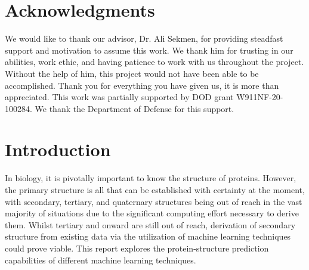 \documentclass[12pt,letterpaper,oneside,reqno]{book}
\theoremstyle{plain}
\theoremstyle{definition}
\theoremstyle{plain}
\theoremstyle{remark}
\theoremstyle{plain}
\theoremstyle{definition}
\theoremstyle{plain}
\begin{document}
\chapter{Acknowledgments}

We would like to thank our advisor, Dr. Ali Sekmen, for providing steadfast support and motivation to assume this work. We thank him for trusting in our abilities, work ethic, and having patience to work with us throughout the project. Without the help of him, this project would not have been able to be accomplished. Thank you for everything you have given us, it is more than appreciated. This work was partially supported by DOD grant W911NF-20-100284. We thank the Department of Defense for this support.


\singlespacing
\tableofcontents

\listoffigures
{}

\listoftables
{}


\lstlistoflistings
{}

\doublespacing


\mainmatter
{}

\chapter{Introduction}
In biology, it is pivotally important to know the structure of proteins. However, the primary structure is all that can be established with certainty at the moment, with secondary, tertiary, and quaternary structures being out of reach in the vast majority of situations due to the significant computing effort necessary to derive them. Whilst tertiary and onward are still out of reach, derivation of secondary structure from existing data via the utilization of machine learning techniques could prove viable. This report explores the protein-structure prediction capabilities of different machine learning techniques.
\end{document}
